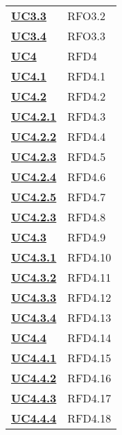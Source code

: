 \begin{longtable}[H]{| >{\centering\bfseries}p{8cm} | >{\centering\arraybackslash}p{8cm} |}
    \hyperref[ssub:uc3.3]{UC3.3} & RFO3.2 \\

    \hyperref[ssub:uc3.4]{UC3.4} & RFO3.3 \\

    \hyperref[sub:uc4]{UC4} & RFD4 \\

    \hyperref[ssub:uc4.1]{UC4.1} & RFD4.1 \\

    \hyperref[ssub:uc4.2]{UC4.2} & RFD4.2 \\

    \hyperref[par:uc4.2.1]{UC4.2.1} & RFD4.3 \\

    \hyperref[par:uc4.2.2]{UC4.2.2} & RFD4.4 \\

    \hyperref[par:uc4.2.3]{UC4.2.3}  & RFD4.5 \\

    \hyperref[par:uc4.2.4]{UC4.2.4} & RFD4.6 \\

    \hyperref[par:uc4.2.5]{UC4.2.5} & RFD4.7 \\

    \hyperref[par:uc4.2.3]{UC4.2.3} & RFD4.8 \\
    
    \hyperref[ssub:uc4.3]{UC4.3} & RFD4.9 \\

    \hyperref[par:uc4.3.1]{UC4.3.1} & RFD4.10 \\

    \hyperref[par:uc4.3.2]{UC4.3.2} & RFD4.11 \\

    \hyperref[par:uc4.3.3]{UC4.3.3} & RFD4.12 \\

    \hyperref[par:uc4.3.2]{UC4.3.4} & RFD4.13 \\

    \hyperref[ssub:uc4.4]{UC4.4} & RFD4.14 \\

    \hyperref[par:uc4.4.1]{UC4.4.1} & RFD4.15 \\

    \hyperref[par:uc4.4.2]{UC4.4.2} & RFD4.16 \\

    \hyperref[par:uc4.4.3]{UC4.4.3}  & RFD4.17 \\

    \hyperref[par:uc4.4.4]{UC4.4.4} & RFD4.18 \\


\end{longtable}
